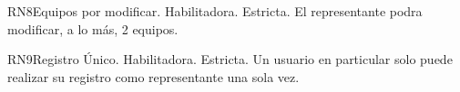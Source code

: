 \begin{BussinesRule}{RN8}{Equipos por modificar.} 
	\BRitem[Tipo:] Habilitadora.
	\BRitem[Nivel:] Estricta.
	\BRitem[Descripción:] El representante podra modificar, a lo más, 2 equipos.
\end{BussinesRule}

\begin{BussinesRule}{RN9}{Registro Único.} 
	\BRitem[Tipo:] Habilitadora.
	\BRitem[Nivel:] Estricta.
	\BRitem[Descripción:] Un usuario en particular solo puede realizar su registro como representante una sola vez.
\end{BussinesRule}
	
